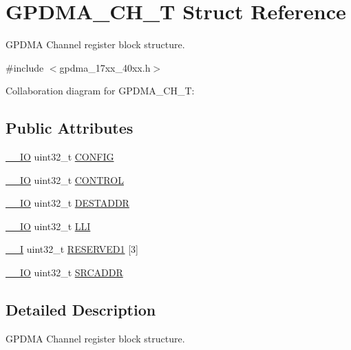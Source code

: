 \hypertarget{structGPDMA__CH__T}{}\section{G\+P\+D\+M\+A\+\_\+\+C\+H\+\_\+T Struct Reference}
\label{structGPDMA__CH__T}


G\+P\+D\+MA Channel register block structure.  




{\ttfamily \#include $<$gpdma\+\_\+17xx\+\_\+40xx.\+h$>$}



Collaboration diagram for G\+P\+D\+M\+A\+\_\+\+C\+H\+\_\+T\+:
\subsection*{Public Attributes}
\begin{DoxyCompactItemize}
\item 
\hyperlink{core__cm3_8h_aec43007d9998a0a0e01faede4133d6be}{\+\_\+\+\_\+\+IO} uint32\+\_\+t \hyperlink{structGPDMA__CH__T_a4f74d11c01d0d3203ceeebd9db2a50a8}{C\+O\+N\+F\+IG}
\item 
\hyperlink{core__cm3_8h_aec43007d9998a0a0e01faede4133d6be}{\+\_\+\+\_\+\+IO} uint32\+\_\+t \hyperlink{structGPDMA__CH__T_a7b2997d55e2bbe71c2f99d5879ca75c3}{C\+O\+N\+T\+R\+OL}
\item 
\hyperlink{core__cm3_8h_aec43007d9998a0a0e01faede4133d6be}{\+\_\+\+\_\+\+IO} uint32\+\_\+t \hyperlink{structGPDMA__CH__T_ab61baba3fc08a7ba4b0502d043ed6ccd}{D\+E\+S\+T\+A\+D\+DR}
\item 
\hyperlink{core__cm3_8h_aec43007d9998a0a0e01faede4133d6be}{\+\_\+\+\_\+\+IO} uint32\+\_\+t \hyperlink{structGPDMA__CH__T_a240936dbac9f3a949572b3dd196bd83f}{L\+LI}
\item 
\hyperlink{core__cm3_8h_af63697ed9952cc71e1225efe205f6cd3}{\+\_\+\+\_\+I} uint32\+\_\+t \hyperlink{structGPDMA__CH__T_ae6a0ee831032674d792f9da150e3025e}{R\+E\+S\+E\+R\+V\+E\+D1} \mbox{[}3\mbox{]}
\item 
\hyperlink{core__cm3_8h_aec43007d9998a0a0e01faede4133d6be}{\+\_\+\+\_\+\+IO} uint32\+\_\+t \hyperlink{structGPDMA__CH__T_a734e1803144cdaa3cfab1507fa4f05d9}{S\+R\+C\+A\+D\+DR}
\end{DoxyCompactItemize}


\subsection{Detailed Description}
G\+P\+D\+MA Channel register block structure. 

